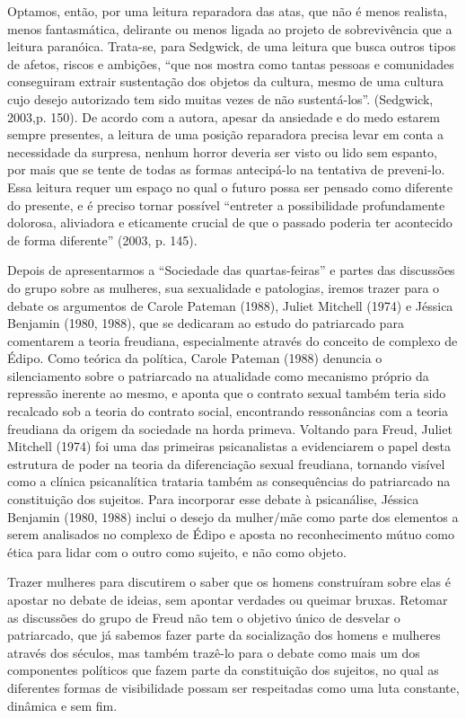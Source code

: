 Optamos, então, por uma leitura reparadora das atas, que não é menos
realista, menos fantasmática, delirante ou menos ligada ao projeto de
sobrevivência que a leitura paranóica. Trata-se, para Sedgwick, de uma
leitura que busca outros tipos de afetos, riscos e ambições, ``que nos
mostra como tantas pessoas e comunidades conseguiram extrair sustentação
dos objetos da cultura, mesmo de uma cultura cujo desejo autorizado tem
sido muitas vezes de não sustentá-los''. (Sedgwick, 2003,p. 150). De
acordo com a autora, apesar da ansiedade e do medo estarem sempre
presentes, a leitura de uma posição reparadora precisa levar em conta a
necessidade da surpresa, nenhum horror deveria ser visto ou lido sem
espanto, por mais que se tente de todas as formas antecipá-lo na
tentativa de preveni-lo. Essa leitura requer um espaço no qual o futuro
possa ser pensado como diferente do presente, e é preciso tornar
possível ``entreter a possibilidade profundamente dolorosa, aliviadora e
eticamente crucial de que o passado poderia ter acontecido de forma
diferente'' (2003, p. 145).

Depois de apresentarmos a ``Sociedade das quartas-feiras'' e partes das
discussões do grupo sobre as mulheres, sua sexualidade e patologias,
iremos trazer para o debate os argumentos de Carole Pateman (1988),
Juliet Mitchell (1974) e Jéssica Benjamin (1980, 1988), que se dedicaram
ao estudo do patriarcado para comentarem a teoria freudiana,
especialmente através do conceito de complexo de Édipo. Como teórica da
política, Carole Pateman (1988) denuncia o silenciamento sobre o
patriarcado na atualidade como mecanismo próprio da repressão inerente
ao mesmo, e aponta que o contrato sexual também teria sido recalcado sob
a teoria do contrato social, encontrando ressonâncias com a teoria
freudiana da origem da sociedade na horda primeva. Voltando para Freud,
Juliet Mitchell (1974) foi uma das primeiras psicanalistas a
evidenciarem o papel desta estrutura de poder na teoria da diferenciação
sexual freudiana, tornando visível como a clínica psicanalítica trataria
também as consequências do patriarcado na constituição dos sujeitos.
Para incorporar esse debate à psicanálise, Jéssica Benjamin (1980, 1988)
inclui o desejo da mulher/mãe como parte dos elementos a serem
analisados no complexo de Édipo e aposta no reconhecimento mútuo como
ética para lidar com o outro como sujeito, e não como objeto.

Trazer mulheres para discutirem o saber que os homens construíram sobre
elas é apostar no debate de ideias, sem apontar verdades ou queimar
bruxas. Retomar as discussões do grupo de Freud não tem o objetivo único
de desvelar o patriarcado, que já sabemos fazer parte da socialização
dos homens e mulheres através dos séculos, mas também trazê-lo para o
debate como mais um dos componentes políticos que fazem parte da
constituição dos sujeitos, no qual as diferentes formas de visibilidade
possam ser respeitadas como uma luta constante, dinâmica e sem fim.


